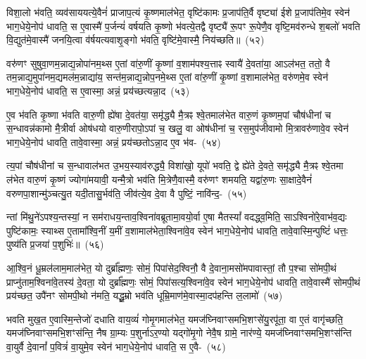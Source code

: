 विशा॒लो भ॑वति॒ व्यव॑साययत्ये॒वैनं॑ प्राजाप॒त्यं कृ॒ष्णमा\-ल॑भेत॒ वृष्टि॑कामः प्र॒जा\-प॑ति॒र्वै वृष्ट्या॑ ईशे प्र॒जा\-प॑तिमे॒व स्वेन॑ भाग॒\-धेये॒नोप॑ धावति॒ स ए॒वास्मै॑ प॒र्जन्यं॑ वर्\mbox{}षयति कृ॒ष्णो भ॑वत्ये॒तद्वै वृष्ट्यै॑ रू॒पꣳ रू॒पेणै॒व वृष्टि॒मव॑\-रुन्धे श॒बलो॑ भवति वि॒द्युत॑मे॒वास्मै॑ जनयि॒त्वा व॑र्\mbox{}षयत्यवाशृ॒ङ्गो भ॑वति॒ वृष्टि॑मे॒वास्मै॒ निय॑च्छति॥~(५२)\ip

{\anuvakamend[शृ॒णाति॑ मिथु॒नाना᳚न्नयति यच्छति॥]}

वरु॑णꣳ सुषुवा॒णम॒न्नाद्य॒न्नोपा॑नम॒थ्स ए॒तां वा॑रु॒णीं कृ॒ष्णां व॒शाम॑पश्य॒त्ताꣴ स्वायै॑ दे॒वता॑या॒ आ\-ऽल॑भत॒ ततो॒ वै तम॒न्नाद्य॒मुपा॑नम॒द्यमल॑म॒न्नाद्या॑य॒ सन्त॑म॒न्नाद्य॒न्नोप॒नमे॒थ्स ए॒तां वा॑रु॒णीं कृ॒ष्णां व॒शामा\-ल॑भेत॒ वरु॑णमे॒व स्वेन॑ भाग॒\-धेये॒नोप॑ धावति॒ स ए॒वास्मा॒ अन्नं॒ प्रय॑च्छत्यन्ना॒द~(५३)\ip

ए॒व भ॑वति कृ॒ष्णा भ॑वति वारु॒णी ह्ये॑षा दे॒वत॑या॒ समृ॑द्ध्यै मै॒त्रꣴ श्वे॒तमाल॑भेत वारु॒णं कृ॒ष्णम॒पां चौष॑धीनां च स॒न्धावन्न॑कामो मै॒त्रीर्वा ओष॑धयो वारु॒णीरापो॒\-ऽपां च॒ खलु॒ वा ओष॑धीनां च॒ रस॒मुप॑जीवामो मि॒त्रावरु॑णावे॒व स्वेन॑ भाग॒\-धेये॒नोप॑ धावति॒ तावे॒वास्मा॒ अन्नं॒ प्रय॑च्छतो\-ऽन्ना॒द ए॒व भ॑व-~(५४)\ip

त्य॒पां चौष॑धीनां च स॒न्धावाल॑भत उ॒भय॒स्याव॑रुद्ध्यै॒ विशा॑खो॒ यूपो॑ भवति॒ द्वे ह्ये॑ते दे॒वते॒ समृ॑द्ध्यै मै॒त्रꣴ श्वे॒तमा ल॑भेत वारु॒णं कृ॒ष्णं ज्योगा॑मयावी॒ यन्मै॒त्रो भव॑ति मि॒त्रेणै॒वास्मै॒ वरु॑णꣳ शमयति॒ यद्वा॑रु॒णः सा॒क्षादे॒वैनं॑ वरुण\-पा॒शान्मु॑ञ्चत्यु॒त यदी॒तासु॒र्भव॑ति॒ जीव॑त्ये॒व दे॒वा वै पुष्टिं॒ नावि॑न्द॒-~(५५)\ip

न्तां मि॑थु॒ने॑\-ऽपश्य॒न्तस्यां॒ न सम॑राधय॒न्ताव॒श्विना॑\-वब्रूतामा॒वयो॒र्वा ए॒षा मैतस्यां᳚ वदद्ध्व॒मिति॒ सा\-ऽश्विनो॑रे॒वाभ॑व॒द्यः पुष्टि॑कामः॒ स्याथ्स ए॒तामा᳚श्वि॒नीं य॒मीं व॒शामाल॑भे\-ता॒श्विना॑\-वे॒व स्वेन॑ भाग॒\-धेये॒नोप॑ धावति॒ तावे॒वास्मि॒न्पुष्टिं॑ धत्तः॒ पुष्य॑ति प्र॒जया॑ प॒शुभिः॑॥~(५६)\ip

{\anuvakamend[{अ॒न्ना॒दो᳚\-ऽन्ना॒द ए॒व भ॑वत्यविन्द॒न्पञ्च॑चत्वारिꣳशच्च}]}

आ॒श्वि॒नं धू॒म्रल॑लाम॒मा\-ल॑भेत॒ यो दुर्ब्रा᳚ह्मणः॒ सोमं॒ पिपा॑सेद॒श्विनौ॒ वै दे॒वाना॒मसो॑मपा\-वास्तां॒ तौ प॒श्चा सो॑मपी॒थं प्राप्नु॑ताम॒श्विना॑वे॒तस्य॑ दे॒वता॒ यो दुर्ब्रा᳚ह्मणः॒ सोमं॒ पिपा॑सत्य॒श्विना॑\-वे॒व स्वेन॑ भाग॒\-धेये॒नोप॑ धावति॒ तावे॒वास्मै॑ सोमपी॒थं प्रय॑च्छत॒ उपै॑नꣳ सोमपी॒थो न॑मति॒ यद्धू॒म्रो भव॑ति धूम्रि॒माण॑मे॒वास्मा॒दप॑हन्ति ल॒लामो॑~(५७)\ip

भवति मुख॒त ए॒वास्मि॒न्तेजो॑ दधाति वाय॒व्यं॑ गोमृ॒गमा\-ल॑भेत॒ यमज॑घ्निवाꣳसमभि॒\-शꣳसे॑यु॒रपू॑ता॒ वा ए॒तं वागृ॑च्छति॒ यमज॑घ्निवाꣳसमभि॒शꣳस॑न्ति॒ नैष ग्रा॒म्यः प॒शुर्ना\-ऽर॒ण्यो यद्गो॑मृ॒गो नेवै॒ष ग्रामे॒ नार॑ण्ये॒ यमज॑घ्निवाꣳसमभि॒शꣳस॑न्ति वा॒युर्वै दे॒वानां᳚ प॒वित्रं॑ वा॒युमे॒व स्वेन॑ भाग॒\-धेये॒नोप॑ धावति॒ स ए॒वै-~(५८)\ip

